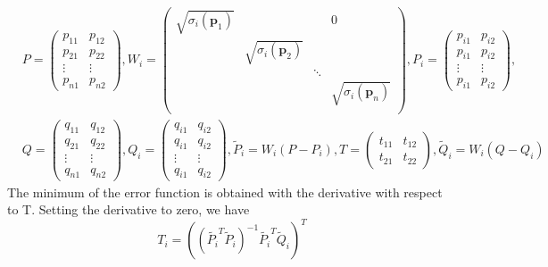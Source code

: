 \documentclass[12pt]{article}
\begin{document}
\begin{equation}
    \begin{split}
        &P=\left(
        \begin{array}{cc}
                p_{11} & p_{12} \\
                p_{21} & p_{22} \\
                \vdots & \vdots \\
                p_{n1} & p_{n2}
            \end{array}
        \right),W_i=\left(
        \begin{array}{cccc}
                \sqrt{\sigma_i(\mathbf{p}_1)} &                               &        & 0                             \\
                                              & \sqrt{\sigma_i(\mathbf{p}_2)} &        &                               \\
                                              &                               & \ddots &                               \\
                                              &                               &        & \sqrt{\sigma_i(\mathbf{p}_n)} \\
            \end{array}
        \right),P_i=\left(
        \begin{array}{cc}
                p_{i1} & p_{i2} \\
                p_{i1} & p_{i2} \\
                \vdots & \vdots \\
                p_{i1} & p_{i2}
            \end{array}
        \right),\\
        &Q=\left(
        \begin{array}{cc}
                q_{11} & q_{12} \\
                q_{21} & q_{22} \\
                \vdots & \vdots \\
                q_{n1} & q_{n2}
            \end{array}
        \right),Q_i=\left(
        \begin{array}{cc}
                q_{i1} & q_{i2} \\
                q_{i1} & q_{i2} \\
                \vdots & \vdots \\
                q_{i1} & q_{i2}
            \end{array}
        \right),\tilde{P}_i=W_i(P-P_i),T=\left(
        \begin{array}{cc}
                t_{11} & t_{12} \\
                t_{21} & t_{22}
            \end{array}
        \right),\tilde{Q}_i=W_i(Q-Q_i)
    \end{split}
\end{equation}
The minimum of the error function is obtained with the derivative with respect to T. Setting the derivative to zero, we have
\begin{equation}
    T_i=((\tilde{P_i}^T\tilde{P}_i)^{-1}\tilde{P_i}^T\tilde{Q}_i)^T
\end{equation}
\end{document}
